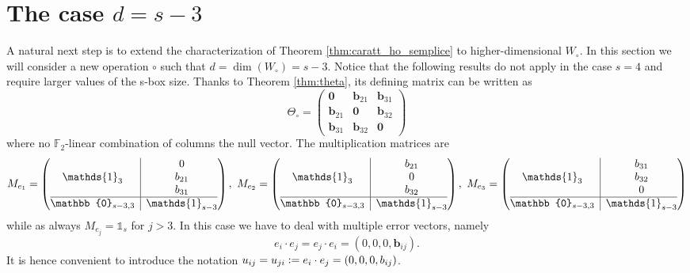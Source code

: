 \documentclass[runningheads,a4paper,english]{llncs}
\newcommand{\F}{\mathbb{F}}
\newcommand{\defeq}{\vcentcolon=}
\newcommand{\ind}[1]{\mathds{1}_{#1}}
\renewcommand{\b}{\textbf{b}}
\newcommand{\Wo}{W_\circ}
\newcommand{\wo}{W_\circ}
\begin{document}
\section{The case $d = s-3$}
\label{sec:n3}
A natural next step is to extend the characterization of Theorem \ref{thm:caratt_ho_semplice} to higher-dimensional $\wo$. In this section we will consider a new operation $\circ$ such that $d = \dim(\Wo) = s-3$. Notice that the following results do not apply in the case $s=4$ and require larger values of the s-box size. Thanks to Theorem \ref{thm:theta}, its defining matrix can be written as 
\[
\Theta_\circ = 
\begin{pmatrix}
	\textbf{0} & \b_{21} & \b_{31} \\
	\b_{21} & \textbf{0} & \b_{32} \\
	\b_{31} & \b_{32} & \textbf{0}
\end{pmatrix}
\]
where no $\F_2$-linear combination of columns the null vector. The multiplication matrices are
\[ 
M_{e_1} = 
\left(\begin{array}{@{}c|c@{}}
	\ind{3} &
	\begin{matrix}
		\textbf{0} \\
		\b_{21} \\
		\b_{31}
	\end{matrix}
	\\
	\hline
	\mathbb{0}_{s-3, 3} &
	\ind{s-3}
\end{array}\right),
\ M_{e_2} = 
\left(\begin{array}{@{}c|c@{}}
	\ind{3} &
	\begin{matrix}
		\b_{21} \\
		\textbf{0} \\
		\b_{32}
	\end{matrix}
	\\
	\hline
	\mathbb{0}_{s-3, 3} &
	\ind{s-3}
\end{array}\right),
\ M_{e_3} = 
\left(\begin{array}{@{}c|c@{}}
	\ind{3} &
	\begin{matrix}
		\b_{31} \\
		\b_{32} \\
		\textbf{0}
	\end{matrix}
	\\
	\hline
	\mathbb{0}_{s-3, 3} &
	\ind{s-3}
\end{array}\right)
\]
while as always $M_{e_j} = \ind{s}$ for $j > 3$. In this case we have to deal with multiple error vectors, namely
\[
e_i \cdot e_j = e_j \cdot e_i = (0, 0, 0, \b_{ij}).
\]
It is hence convenient to introduce the notation $u_{ij} = u_{ji} \defeq e_i \cdot e_j = (0, 0, 0, \b_{ij})$.
\end{document}
